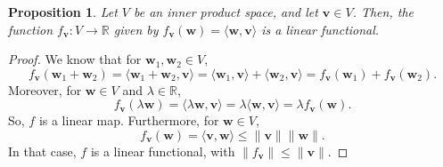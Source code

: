 \documentclass[a4paper, openany]{memoir}
\theoremstyle{definition}
\theoremstyle{plain}
\newtheorem{proposition}[definition]{Proposition}
\begin{document}
    \begin{proposition}
        Let $V$ be an inner product space, and let $\bm{v} \in V$. Then, the function $f_{\bm{v}}: V \to \mathbb{R}$ given by $f_{\bm{v}}(\bm{w}) = \langle \bm{w}, \bm{v} \rangle$ is a linear functional.
    \end{proposition}
    \begin{proof}
        We know that for $\bm{w}_1, \bm{w}_2 \in V$,
        \[f_{\bm{v}}(\bm{w}_1 + \bm{w}_2) = \langle \bm{w}_1 + \bm{w}_2, \bm{v} \rangle = \langle \bm{w}_1, \bm{v} \rangle + \langle \bm{w}_2, \bm{v} \rangle = f_{\bm{v}}(\bm{w}_1) + f_{\bm{v}}(\bm{w}_2).\]
        Moreover, for $\bm{w} \in V$ and $\lambda \in \mathbb{R}$,
        \[f_{\bm{v}}(\lambda \bm{w}) = \langle \lambda \bm{w}, \bm{v} \rangle = \lambda \langle \bm{w}, \bm{v} \rangle = \lambda f_{\bm{v}}(\bm{w}).\]
        So, $f$ is a linear map. Furthermore, for $\bm{w} \in V$,
        \[f_{\bm{v}}(\bm{w}) = \langle \bm{v}, \bm{w} \rangle \leq \lVert \bm{v} \rVert \lVert \bm{w} \rVert.\]
        In that case, $f$ is a linear functional, with $\lVert f_{\bm{v}} \rVert \leq \lVert \bm{v} \rVert$.
    \end{proof}
\end{document}
